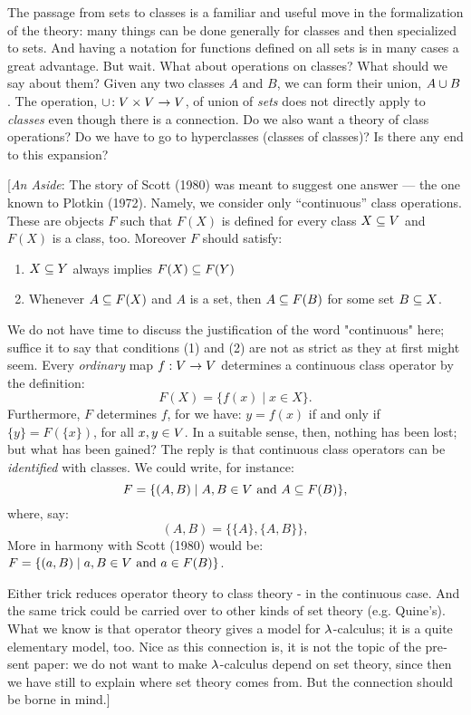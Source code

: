 The passage from sets to classes is a familiar and useful move in the formalization of the theory: many things can be done generally for classes and then specialized to sets. And having a notation for functions defined on all sets is in many cases a great advantage. But wait. What about operations on classes? What should we say about them? Given any two classes $A$ and $B$, we can form their union, $A \cup  B$. The operation, $\cup\!: V \times V \rightarrow V$, of union of {\it sets} does not directly apply to {\it classes} even though there is a connection. Do we also want a theory of class operations? Do we have to go to hyperclasses (classes of classes)? Is there any end to this expansion?


[{\it An Aside}: The story of Scott (1980) was meant to suggest one answer --- the one known to Plotkin (1972). Namely, we con­sider only ``continuous'' class operations. These are objects $F$ such that $F(X)$ is defined for every class $X \subseteq V$ and $F(X)$ is a class, too. Moreover $F$ should satisfy:

\begin{enumerate}

\item $X \subseteq Y$ always implies $F(X)\subseteq F(Y)$

\item Whenever $A \subseteq F(X)$ and $A$ is a set, then $A\subseteq F(B)$ for some set $B \subseteq X$.

\end{enumerate}
%
We do not have time to discuss the justification of the word "continuous" here; suffice it to say that conditions (1) and (2) are not as strict as they at first might seem. Every {\it ordinary} map $f : V \rightarrow V$ determines a continuous class operator by the def­inition:
$$
F(X) = \{f(x) \mid x \in X\}.
$$
%
Furthermore, $F$ determines $f$, for we have: $y = f(x)$ if and only if $\{y\} = F(\{x\})$,
for all $x,y \in V$. In a suitable sense, then, nothing has been lost; but what has been gained?
The reply is that continuous class operators can be {\it identi­fied} with classes. We could write, for instance:
$$ F = \{(A,B) \mid A,B \in V {\textrm { and }} A \subseteq F(B) \},$$
where, say:
$$
(A,B) = \{\{A\}, \{A,B\}\},
$$
More in harmony with Scott (1980) would be: $F = \{(a,B) \mid  a,B \in V {\textrm { and } } a \in F(B)\}$.

Either trick reduces operator theory to class theory - in the continuous case. And the same trick could be carried over to other kinds of set theory (e.g. Quine's). What we know is that operator theory gives a model for $\lambda$-calculus; it is a quite elementary model, too. Nice as this connection is, it is not the topic of the pre­ sent paper: we do not want to make $\lambda$-calculus depend on set theory, since then we have still to explain where set theory comes from. But the connection should be borne in mind.]

